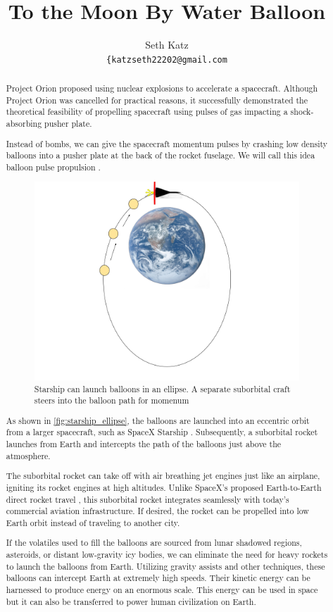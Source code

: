 \documentclass{article}
\title{To the Moon By Water Balloon}
\author{
  Seth Katz \\
  \texttt{\{katzseth22202@gmail.com} \\
}
\begin{document}
\maketitle


\begin{abstract}
    Project Orion \cite{projorion} proposed using nuclear explosions to accelerate a spacecraft.  Although Project Orion was cancelled for practical reasons,  it successfully demonstrated the theoretical feasibility of propelling spacecraft using pulses of gas impacting a shock-absorbing pusher plate.

    Instead of bombs, we can give the spacecraft momentum pulses by crashing low density balloons into a pusher plate at the back of the rocket fuselage.  We will call this idea balloon pulse propulsion \cite{aim2024}.
 \begin{figure}[h]
    \centering
    \includegraphics[width=0.5\linewidth]{images/Starship_Impact_ellipse.png}
    \caption{Starship can launch balloons in an ellipse.   A separate suborbital craft steers into the balloon path for momenum}
    \label{fig:starship_ellipse}
\end{figure}

As shown in \autoref{fig:starship_ellipse}, the balloons are launched into an eccentric orbit from a larger spacecraft, such as SpaceX Starship \cite{starship}.   Subsequently, a suborbital rocket launches from Earth and intercepts the path of the balloons just above the atmosphere.    

The suborbital rocket can take off with air breathing jet engines just like an airplane, igniting its rocket engines at high altitudes. Unlike SpaceX’s proposed Earth-to-Earth direct rocket travel \cite{spacex_earth_earth}, this suborbital rocket integrates seamlessly with today’s commercial aviation infrastructure. If desired, the rocket can be propelled into low Earth orbit instead of traveling to another city.

If the volatiles used to fill the balloons are sourced from lunar shadowed regions, asteroids, or distant low-gravity icy bodies, we can eliminate the need for heavy rockets to launch the balloons from Earth. Utilizing gravity assists and other techniques, these balloons can intercept Earth at extremely high speeds. Their kinetic energy can be harnessed to produce energy on an enormous scale.   This energy can be used in space but it can also be transferred to power human civilization on Earth.


\end{abstract}
\end{document}

